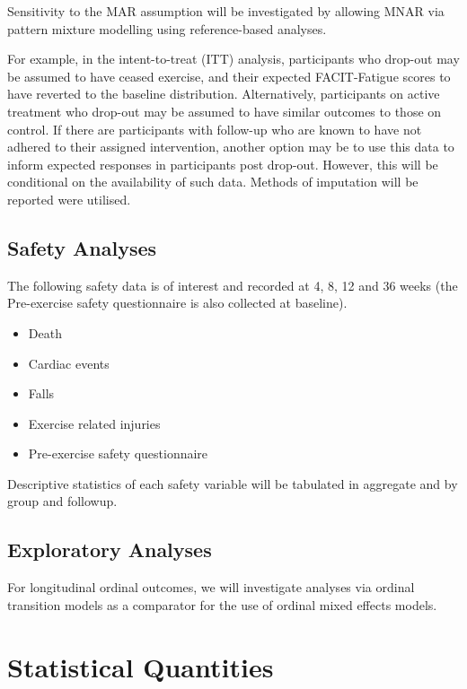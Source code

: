 \documentclass[11pt,parskip=half-]{scrartcl}
\providecommand{\tightlist}{%
  \setlength{\itemsep}{0pt}\setlength{\parskip}{0pt}}
\begin{document}
Sensitivity to the MAR assumption will be investigated by allowing MNAR via pattern mixture modelling using reference-based analyses.

For example, in the intent-to-treat (ITT) analysis, participants who drop-out may be assumed to have ceased exercise, and their expected FACIT-Fatigue scores to have reverted to the baseline distribution. Alternatively, participants on active treatment who drop-out may be assumed to have similar outcomes to those on control. If there are participants with follow-up who are known to have not adhered to their assigned intervention, another option may be to use this data to inform expected responses in participants post drop-out. However, this will be conditional on the availability of such data. Methods of imputation will be reported were utilised.

\subsection{Safety Analyses}\label{safety-analyses}

The following safety data is of interest and recorded at 4, 8, 12 and 36 weeks (the Pre-exercise safety questionnaire is also collected at baseline).

\begin{itemize}\tightlist
  \item Death
  \item Cardiac events
  \item Falls
  \item Exercise related injuries
  \item Pre-exercise safety questionnaire
\end{itemize}

Descriptive statistics of each safety variable will be tabulated in aggregate and by group and followup.

\subsection{Exploratory Analyses}\label{exploratory-analyses}

For longitudinal ordinal outcomes, we will investigate analyses via ordinal transition models as a comparator for the use of ordinal mixed effects models.

\clearpage

\section{Statistical Quantities}\label{statistical-quantities}
\end{document}
